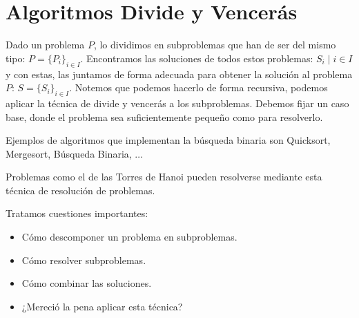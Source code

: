 \chapter{Algoritmos Divide y Vencerás}
Dado un problema $P$, lo dividimos en subproblemas que han de ser del mismo tipo: $P = \{P_i\}_{i\in I}$. Encontramos las soluciones de todos estos problemas: $S_i \mid i \in I$ y con estas, las juntamos de forma adecuada para obtener la solución al problema $P$: $S = \{S_i\}_{i \in I}$. Notemos que podemos hacerlo de forma recursiva, podemos aplicar la técnica de divide y vencerás a los subproblemas. Debemos fijar un caso base, donde el problema sea suficientemente pequeño como para resolverlo.

Ejemplos de algoritmos que implementan la búsqueda binaria son Quicksort, Mergesort, Búsqueda Binaria, $\ldots$

Problemas como el de las Torres de Hanoi pueden resolverse mediante esta técnica de resolución de problemas.

Tratamos cuestiones importantes:
\begin{itemize}
    \item Cómo descomponer un problema en subproblemas.
    \item Cómo resolver subproblemas.
    \item Cómo combinar las soluciones.
    \item ¿Mereció la pena aplicar esta técnica?
\end{itemize}

